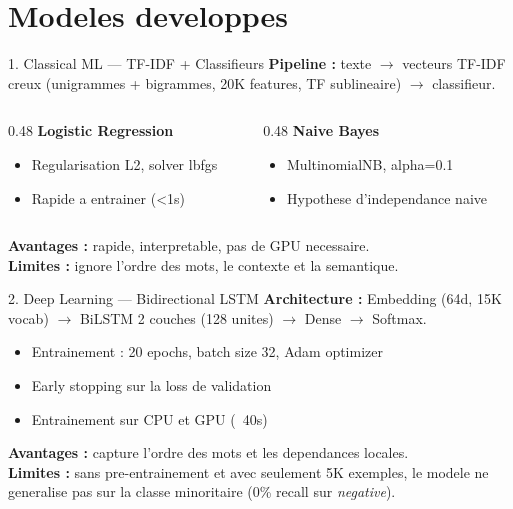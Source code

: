 \documentclass[aspectratio=169, 11pt]{beamer}
\begin{document}
\section{Modeles developpes}

\begin{frame}{1. Classical ML --- TF-IDF + Classifieurs}
  \textbf{Pipeline :} texte $\rightarrow$ vecteurs TF-IDF creux (unigrammes + bigrammes, 20K features, TF sublineaire) $\rightarrow$ classifieur.
  \vspace{0.3cm}
  \begin{columns}[T]
    \begin{column}{0.48\textwidth}
      \textbf{Logistic Regression}
      \begin{itemize}
        \item Regularisation L2, solver lbfgs
        \item Rapide a entrainer (<1s)
      \end{itemize}
    \end{column}
    \begin{column}{0.48\textwidth}
      \textbf{Naive Bayes}
      \begin{itemize}
        \item MultinomialNB, alpha=0.1
        \item Hypothese d'independance naive
      \end{itemize}
    \end{column}
  \end{columns}
  \vspace{0.5cm}
  \textbf{Avantages :} rapide, interpretable, pas de GPU necessaire.\\
  \textbf{Limites :} ignore l'ordre des mots, le contexte et la semantique.
\end{frame}

\begin{frame}{2. Deep Learning --- Bidirectional LSTM}
  \textbf{Architecture :} Embedding (64d, 15K vocab) $\rightarrow$ BiLSTM 2 couches (128 unites) $\rightarrow$ Dense $\rightarrow$ Softmax.
  \vspace{0.3cm}
  \begin{itemize}
    \item Entrainement : 20 epochs, batch size 32, Adam optimizer
    \item Early stopping sur la loss de validation
    \item Entrainement sur CPU et GPU (~40s)
  \end{itemize}
  \vspace{0.3cm}
  \textbf{Avantages :} capture l'ordre des mots et les dependances locales.\\[6pt]
  \textbf{Limites :} sans pre-entrainement et avec seulement 5K exemples, le modele ne generalise pas sur la classe minoritaire (0\% recall sur \emph{negative}).
\end{frame}
\end{document}
